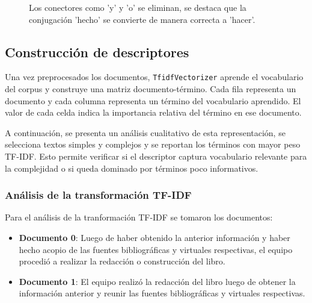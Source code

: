 \documentclass[12pt]{article}
\begin{document}
\begin{figure}[H]
\centering
\begin{subfigure}{0.48\textwidth}
\end{subfigure}
\begin{subfigure}{0.48\textwidth}
\end{subfigure}
\caption{Los conectores como 'y' y 'o' se eliminan, se destaca que la conjugación 'hecho' se convierte de manera correcta a 'hacer'.}
\end{figure}


\subsection{Construcción de descriptores}

Una vez preprocesados los documentos, \texttt{TfidfVectorizer} aprende el vocabulario del corpus y construye una matriz documento-término. Cada fila representa un documento y cada columna representa un término del vocabulario aprendido. El valor de cada celda indica la importancia relativa del término en ese documento.

A continuación, se presenta un análisis cualitativo de esta representación, se selecciona textos simples y complejos y se reportan los términos con mayor peso TF-IDF. Esto permite verificar si el descriptor captura vocabulario relevante para la complejidad o si queda dominado por términos poco informativos.

\subsubsection{Análisis de la transformación TF-IDF}
Para el análisis de la tranformación TF-IDF se tomaron los documentos:
\begin{itemize}
\item \textbf{Documento 0}: Luego de haber obtenido la anterior información y haber hecho acopio de las fuentes bibliográficas y virtuales respectivas, el equipo procedió a realizar la redacción o construcción del libro.
\item \textbf{Documento 1}: El equipo realizó la redacción del libro luego de obtener la información anterior y reunir las fuentes bibliográficas y virtuales respectivas.
\end{itemize}
\end{document}
